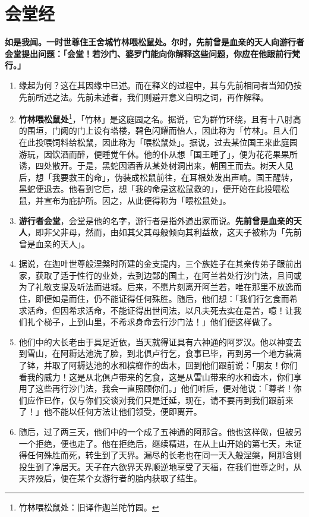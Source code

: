 \section{会堂经}

\textbf{如是我闻。一时世尊住王舍城竹林喂松鼠处。尔时，先前曾是血亲的天人向游行者会堂提出问题：「会堂！若沙门、婆罗门能向你解释这些问题，你应在他跟前行梵行。」}

\begin{enumerate}\item 缘起为何？这在其因缘中已述。而在释义的过程中，其与先前相同者当知仍按先前所述之法。先前未述者，我们则避开意义自明之词，再作解释。
\item \textbf{竹林喂松鼠处}\footnote{竹林喂松鼠处：旧译作迦兰陀竹园。}，「竹林」是这庭园之名。据说，它为群竹环绕，且有十八肘高的围垣，门阙的门上设有塔楼，碧色闪耀而怡人，因此称为「竹林」。且人们在此投喂饲料给松鼠，因此称为「喂松鼠处」。据说，过去某位国王来此庭园游玩，因饮酒而醉，便睡觉午休。他的仆从想「国王睡了」，便为花花果果所诱，四处散开。于是，黑蛇因酒香从某处树洞出来，朝国王而去。树天人见后，想「我要救王的命」，伪装成松鼠前往，在耳根处发出声响。国王醒转，黑蛇便退去。他看到它后，想「我的命是这松鼠救的」，便开始在此投喂松鼠，并宣布为庇护所。因之，从此便得称为「喂松鼠处」。
\item \textbf{游行者会堂}，会堂是他的名字，游行者是指外道出家而说。\textbf{先前曾是血亲的天人}，即非父非母，然而，由如其父其母般倾向其利益故，这天子被称为「先前曾是血亲的天人」。
\item 据说，在迦叶世尊般涅槃时所建的金支提内，三个族姓子在其亲传弟子跟前出家，获取了适于性行的业处，去到边鄙的国土，在阿兰若处行沙门法，且间或为了礼敬支提及听法而进城。后来，不愿片刻离开阿兰若，唯在那里不放逸而住，即便如是而住，仍不能证得任何殊胜。随后，他们想：「我们行乞食而希求活命，但因希求活命，不能证得出世间法，以凡夫死去实在是苦，噫！让我们扎个梯子，上到山里，不希求身命去行沙门法！」他们便这样做了。
\item 他们中的大长老由于具足近依，当天就得证具有六神通的阿罗汉。他以神变去到雪山，在阿耨达池洗了脸，到北俱卢行乞，食事已毕，再到另一个地方装满了钵，并取了阿耨达池的水和槟榔作的齿木，回到他们跟前说：「朋友！你们看我的威力！这是从北俱卢带来的乞食，这是从雪山带来的水和齿木，你们享用了这些再行沙门法，我会一直照顾你们。」他们听后，便对他说：「尊者！你们应作已作，仅与你们交谈对我们只是迁延，现在，请不要再到我们跟前来了！」他不能以任何方法让他们领受，便即离开。
\item 随后，过了两三天，他们中的一个成了五神通的阿那含。他也这样做，但被另一个拒绝，便也走了。他在拒绝后，继续精进，在从上山开始的第七天，未证得任何殊胜而死，转生到了天界。漏尽的长老也在同一天入般涅槃，阿那含则投生到了净居天。天子在六欲界天界顺逆地享受了天福，在我们世尊之时，从天界殁后，便在某个女游行者的胎内获取了结生。

\end{enumerate}
